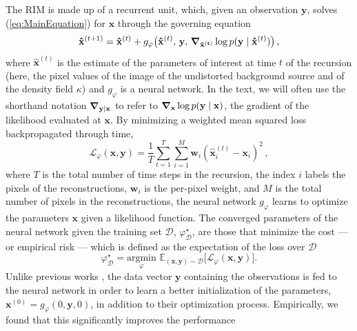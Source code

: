  The RIM is made up of a recurrent unit, which, given an observation $\mathbf{y}$, solves (\ref{eq:MainEquation}) for $\mathbf{x}$ through the governing equation
\begin{equation}\label{eq:RIM}
        \mathbf{\hat{x}}^{(t+1)} = \mathbf{\hat{x}}^{(t)} 
        + g_\varphi \big(\mathbf{\hat{x}}^{(t)},\, \mathbf{y},\, 
\grad_{\mathbf{\hat{x}^{(t)}}} \log p(\mathbf{y} \mid \mathbf{\hat{x}}^{(t)})\big)\, ,
\end{equation}
where $\mathbf{\hat{x}}^{(t)}$ is the estimate of the parameters of interest at time $t$ of the recursion (here, the pixel values of the image of the undistorted background source and of the density field $\kappa$) and $g_\varphi$ is a neural network. In the text, we will often use the shorthand notation $\grad_{\mathbf{y} \mid \mathbf{x}}$ to refer to $\grad_{\mathbf{x}} \log p(\mathbf{y} \mid \mathbf{x})$, the gradient of the likelihood evaluated at $\mathbf{x}$.
By minimizing a weighted mean squared loss backpropagated 
through time, 
\begin{equation}\label{eq:Loss}
		\mathcal{L}_\varphi(\mathbf{x}, \mathbf{y}) = 
		\frac{1}{T}\sum_{t=1}^{T}\sum_{i=1}^{M} \mathbf{w}_i (\mathbf{\hat{x}}^{(t)}_i - \mathbf{x}_i)^2\, ,
\end{equation} 
where $T$ is the total number of time steps in the recursion, the index $i$ labels the pixels of the reconstructions, $\mathbf{w}_i$ is the per-pixel weight, and $M$ is the total number of pixels in the reconstructions, the neural network $g_\varphi$ learns to optimize the parameters $\mathbf{x}$ given a likelihood function. 
The converged parameters of the neural network given the training set $\mathcal{D}$, 
$\varphi^{\star}_{\mathcal{D}}$, are those that minimize the cost --- or empirical risk ---
which is defined as the 
expectation of the loss over $\mathcal{D}$
\begin{equation}\label{eq:Cost} 
		\varphi^{\star}_{\mathcal{D}} = \underset{\varphi}{\text{argmin}}\,\,
		\mathbb{E}_{(\mathbf{x},\mathbf{y}) \sim \mathcal{D}}\big[
		\mathcal{L}_\varphi(\mathbf{x}, \mathbf{y}) \big].
\end{equation} 
Unlike previous works 
\citep{Andrychowicz2016,Putzky2017,Morningstar2018,Morningstar2019,Lonning2019}, 
the data vector $\mathbf{y}$ containing the observations 
is fed to the neural network in order to learn 
a better initialization of the parameters, $\mathbf{x}^{(0)} = g_\varphi(0, \mathbf{y}, 0)$, 
in addition to their optimization process. 
 Empirically, we found that this significantly improves the performance 
